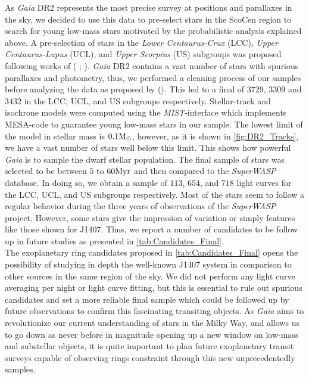 As \textit{Gaia} DR2 represents the most precise survey at positions and parallaxes in the sky, we decided to use this data to pre-select stars in the ScoCen region to search for young low-mass stars motivated by the probabilistic analysis explained above. A pre-selection of stars in the \textit{Lower Centaurus-Crux} (LCC), \textit{Upper Centaurus-Lupus} (UCL), and \textit{Upper Scorpius} (US) subgroups was proposed following works of ( \citeyear{Blaauw46};  \citeyear{1999AJ....117..354D}). \textit{Gaia} DR2 contains a vast number of stars with spurious parallaxes and photometry, thus, we performed a cleaning process of our samples before analyzing the data as proposed by  (\citeyear{2018arXiv180409366L}). This led to a final of $3729$, $3309$ and $3432$ in the LCC, UCL, and US subgroups respectively. Stellar-track and isochrone models were computed using the \textit{MIST}-interface which implements MESA-code to guarantee young low-mass stars in our sample. The lowest limit of the model in stellar mass is $0.1\textnormal{M}_\odot$, however, as it is shown in \autoref{fig:DR2_Tracks}, we have a vast number of stars well below this limit. This shows how powerful \textit{Gaia} is to sample the dwarf stellar population. The final sample of stars was selected to be between $5$ to $60\textnormal{Myr}$ and then compared to the \textit{SuperWASP} database. In doing so, we obtain a sample of $113$, $654$, and $718$ light curves for the LCC, UCL, and US subgroups respectively. Most of the stars seem to follow a regular behavior during the three years of observations of the \textit{SuperWASP} project. However, some stars give the impression of variation or simply features like those shown for J1407. Thus, we report a number of candidates to be follow up in future studies as presented in \autoref{tab:Candidates_Final}.\\

The exoplanetary ring candidates proposed in \autoref{tab:Candidates_Final} opens the possibility of studying in depth the well-known J1407 system in comparison to other sources in the same region of the sky. We did not perform any light curve averaging per night or light curve fitting, but this is essential to rule out spurious candidates and set a more reliable final sample which could be followed up by future observations to confirm this fascinating transiting objects. As \textit{Gaia} aims to revolutionize our current understanding of stars in the Milky Way, and allows us to go down as never before in magnitude opening up a new window on low-mass and substellar objects, it is quite important to plan future exoplanetary transit surveys capable of observing rings constraint through this new unprecedentedly samples.\\

